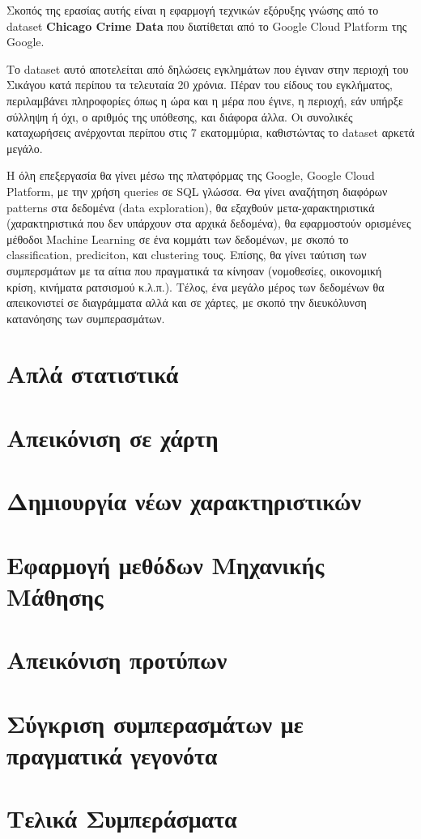 \documentclass{article}
\begin{document}
Σκοπός της ερασίας αυτής είναι η εφαρμογή τεχνικών εξόρυξης γνώσης από το dataset \textbf{Chicago Crime Data} που διατίθεται από το Google Cloud Platform της Google.

Το dataset αυτό αποτελείται από δηλώσεις εγκλημάτων που έγιναν στην περιοχή του Σικάγου κατά περίπου τα τελευταία 20 χρόνια. Πέραν του είδους του εγκλήματος, περιλαμβάνει πληροφορίες όπως η ώρα και η μέρα που έγινε, η περιοχή, εάν υπήρξε σύλληψη ή όχι, ο αριθμός της υπόθεσης, και διάφορα άλλα. Οι συνολικές καταχωρήσεις ανέρχονται περίπου στις 7 εκατομμύρια, καθιστώντας το dataset αρκετά μεγάλο.

Η όλη επεξεργασία θα γίνει μέσω της πλατφόρμας της Google, Google Cloud Platform, με την χρήση queries σε SQL γλώσσα. Θα γίνει αναζήτηση διαφόρων patterns στα δεδομένα (data exploration), θα εξαχθούν μετα-χαρακτηριστικά (χαρακτηριστικά που δεν υπάρχουν στα αρχικά δεδομένα), θα εφαρμοστούν ορισμένες μέθοδοι Machine Learning σε ένα κομμάτι των δεδομένων, με σκοπό το classification, prediciton, και clustering τους. Επίσης, θα γίνει ταύτιση των συμπερσμάτων με τα αίτια που πραγματικά τα κίνησαν (νομοθεσίες, οικονομική κρίση, κινήματα ρατσισμού κ.λ.π.). Τέλος, ένα μεγάλο μέρος των δεδομένων θα απεικονιστεί σε διαγράμματα αλλά και σε χάρτες, με σκοπό την διευκόλυνση κατανόησης των συμπερασμάτων.

\section{Απλά στατιστικά}
\section{Απεικόνιση σε χάρτη}
\section{Δημιουργία νέων χαρακτηριστικών}
\section{Εφαρμογή μεθόδων Μηχανικής Μάθησης}
\section{Απεικόνιση προτύπων}
\section{Σύγκριση συμπερασμάτων με πραγματικά γεγονότα}
\section{Τελικά Συμπεράσματα}




\enddocument 
 
\end{document}
